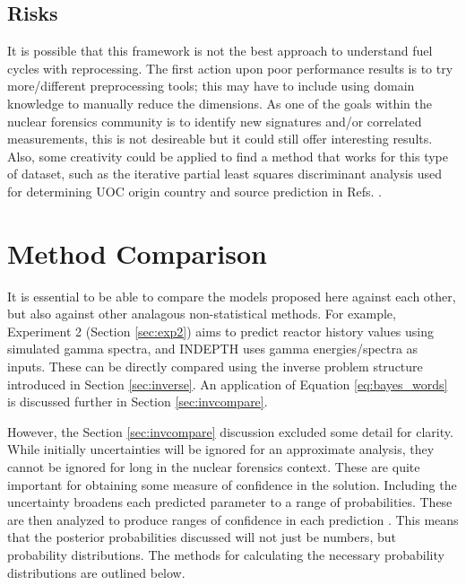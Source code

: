 \subsection*{Risks}

It is possible that this framework is not the best approach to understand fuel
cycles with reprocessing. The first action upon poor performance results is to
try more/different preprocessing tools; this may have to include using domain
knowledge to manually reduce the dimensions. As one of the goals within the
nuclear forensics community is to identify new signatures and/or correlated
measurements, this is not desireable but it could still offer interesting
results. Also, some creativity could be applied to find a method that works for
this type of dataset, such as the iterative partial least squares discriminant
analysis used for determining \gls{UOC} origin country and source prediction in
Refs.  \cite{robel_2009, pu_discrimination}.

\section{Method Comparison}
\label{sec:modelcompare}

It is essential to be able to compare the models proposed here against each
other, but also against other analagous non-statistical methods.  For example,
Experiment 2 (Section \ref{sec:exp2}) aims to predict reactor history values
using simulated gamma spectra, and \gls{INDEPTH} uses gamma energies/spectra as
inputs.  These can be directly compared using the inverse problem structure
introduced in Section \ref{sec:inverse}. An application of Equation
\ref{eq:bayes_words} is discussed further in Section \ref{sec:invcompare}.

However, the Section \ref{sec:invcompare} discussion excluded some detail for
clarity. While initially uncertainties will be ignored for an approximate
analysis, they cannot be ignored for long in the nuclear forensics context.
These are quite important for obtaining some measure of confidence in the
solution.  Including the uncertainty broadens each predicted parameter to a
range of probabilities.  These are then analyzed to produce ranges of
confidence in each prediction \cite{bayes_compare}.  This means that the
posterior probabilities discussed will not just be numbers, but probability
distributions.  The methods for calculating the necessary probability
distributions are outlined below.

